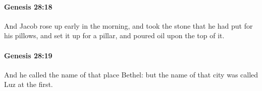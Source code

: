 		\paragraph{Genesis 28:18} %
			\label{GENESIS-28-18}

			And Jacob rose up early in the morning, and took the stone that he had put for his pillows, and set it up for a pillar, and poured oil upon the top of it.


		\paragraph{Genesis 28:19} %
			\label{GENESIS-28-19}

			And he called the name of that place Bethel: but the name of that city was called Luz at the first.


